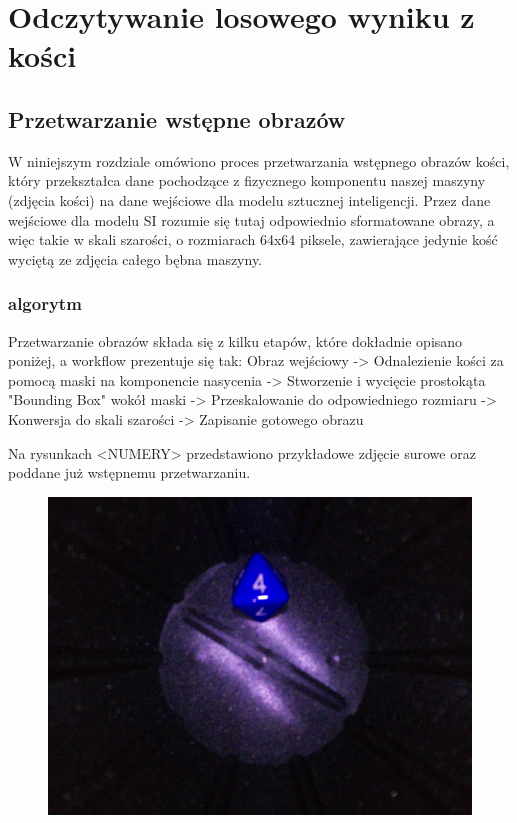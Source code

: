 \chapter{Odczytywanie losowego wyniku z kości}

\section{Przetwarzanie wstępne obrazów}

W niniejszym rozdziale omówiono proces przetwarzania wstępnego obrazów kości,
który przekształca dane pochodzące z fizycznego komponentu naszej maszyny (zdjęcia kości) na dane wejściowe dla modelu sztucznej inteligencji.
Przez dane wejściowe dla modelu SI rozumie się tutaj odpowiednio sformatowane obrazy, a więc takie w skali szarości,
o rozmiarach 64x64 piksele, zawierające jedynie kość wyciętą ze zdjęcia całego bębna maszyny.

\subsection{algorytm}

Przetwarzanie obrazów składa się z kilku etapów, które dokładnie opisano poniżej, a workflow prezentuje się tak:
Obraz wejściowy -> Odnalezienie kości za pomocą maski na komponencie nasycenia -> Stworzenie i wycięcie prostokąta "Bounding Box" wokół maski -> Przeskalowanie do odpowiedniego rozmiaru -> Konwersja do skali szarości -> Zapisanie gotowego obrazu

Na rysunkach <NUMERY> przedstawiono przykładowe zdjęcie surowe oraz poddane już wstępnemu przetwarzaniu.


\begin{figure}[H]
    \centering
    \includegraphics{chapters/04-czytanie/figures/4raw}
    \caption{}
    \label{fig:4raw}
\end{figure}

